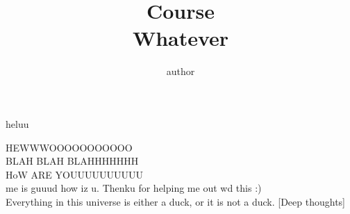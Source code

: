 \documentclass[addpoints]{exam}
\title{Course\\ Whatever}
\author{author}
\begin{document}
\maketitle

\begin{questions}
    \question
     heluu
    \begin{solution}
        HEWWWOOOOOOOOOOO \\ 
        BLAH BLAH BLAHHHHHHH \\ 
        HoW ARE YOUUUUUUUUUU \\
        me is guuud how iz u.
        Thenku for helping me out wd this :)\\
        Everything in this universe is either a duck, or it is not a duck. [Deep thoughts]
    \end{solution}
    
\end{questions}
\end{document}
